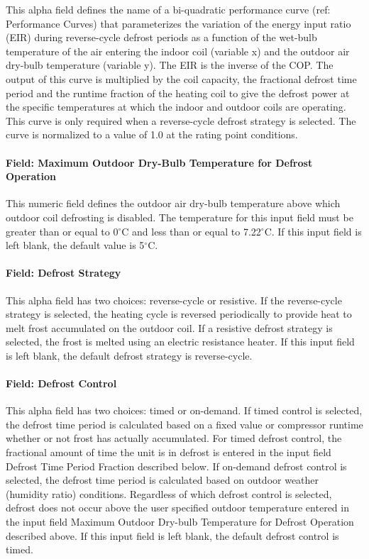 This alpha field defines the name of a bi-quadratic performance curve (ref: Performance Curves) that parameterizes the variation of the energy input ratio (EIR) during reverse-cycle defrost periods as a function of the wet-bulb temperature of the air entering the indoor coil (variable x) and the outdoor air dry-bulb temperature (variable y). The EIR is the inverse of the COP. The output of this curve is multiplied by the coil capacity, the fractional defrost time period and the runtime fraction of the heating coil to give the defrost power at the specific temperatures at which the indoor and outdoor coils are operating. This curve is only required when a reverse-cycle defrost strategy is selected. The curve is normalized to a value of 1.0 at the rating point conditions.

\paragraph{Field: Maximum Outdoor Dry-Bulb Temperature for Defrost Operation}\label{field-maximum-outdoor-dry-bulb-temperature-for-defrost-operation-1}

This numeric field defines the outdoor air dry-bulb temperature above which outdoor coil defrosting is disabled. The temperature for this input field must be greater than or equal to 0$^\circ$C and less than or equal to 7.22$^\circ$C. If this input field is left blank, the default value is 5$^\circ$C.

\paragraph{Field: Defrost Strategy}\label{field-defrost-strategy-1}

This alpha field has two choices: reverse-cycle or resistive. If the reverse-cycle strategy is selected, the heating cycle is reversed periodically to provide heat to melt frost accumulated on the outdoor coil. If a resistive defrost strategy is selected, the frost is melted using an electric resistance heater. If this input field is left blank, the default defrost strategy is reverse-cycle.

\paragraph{Field: Defrost Control}\label{field-defrost-control-1}

This alpha field has two choices: timed or on-demand. If timed control is selected, the defrost time period is calculated based on a fixed value or compressor runtime whether or not frost has actually accumulated. For timed defrost control, the fractional amount of time the unit is in defrost is entered in the input field Defrost Time Period Fraction described below. If on-demand defrost control is selected, the defrost time period is calculated based on outdoor weather (humidity ratio) conditions. Regardless of which defrost control is selected, defrost does not occur above the user specified outdoor temperature entered in the input field Maximum Outdoor Dry-bulb Temperature for Defrost Operation described above. If this input field is left blank, the default defrost control is timed.

